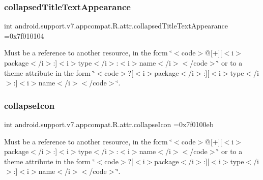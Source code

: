 \subsubsection{\texorpdfstring{collapsed\+Title\+Text\+Appearance}{collapsedTitleTextAppearance}}
{\footnotesize\ttfamily int android.\+support.\+v7.\+appcompat.\+R.\+attr.\+collapsed\+Title\+Text\+Appearance =0x7f010104\hspace{0.3cm}{\ttfamily [static]}}

Must be a reference to another resource, in the form \char`\"{}$<$code$>$@\mbox{[}+\mbox{]}\mbox{[}$<$i$>$package$<$/i$>$\+:\mbox{]}$<$i$>$type$<$/i$>$\+:$<$i$>$name$<$/i$>$$<$/code$>$\char`\"{} or to a theme attribute in the form \char`\"{}$<$code$>$?\mbox{[}$<$i$>$package$<$/i$>$\+:\mbox{]}\mbox{[}$<$i$>$type$<$/i$>$\+:\mbox{]}$<$i$>$name$<$/i$>$$<$/code$>$\char`\"{}. \mbox{\label{classandroid_1_1support_1_1v7_1_1appcompat_1_1R_1_1attr_a8a292560ceb637b93ed32829f1aa456d}} 
\subsubsection{\texorpdfstring{collapse\+Icon}{collapseIcon}}
{\footnotesize\ttfamily int android.\+support.\+v7.\+appcompat.\+R.\+attr.\+collapse\+Icon =0x7f0100eb\hspace{0.3cm}{\ttfamily [static]}}

Must be a reference to another resource, in the form \char`\"{}$<$code$>$@\mbox{[}+\mbox{]}\mbox{[}$<$i$>$package$<$/i$>$\+:\mbox{]}$<$i$>$type$<$/i$>$\+:$<$i$>$name$<$/i$>$$<$/code$>$\char`\"{} or to a theme attribute in the form \char`\"{}$<$code$>$?\mbox{[}$<$i$>$package$<$/i$>$\+:\mbox{]}\mbox{[}$<$i$>$type$<$/i$>$\+:\mbox{]}$<$i$>$name$<$/i$>$$<$/code$>$\char`\"{}. \mbox{\label{classandroid_1_1support_1_1v7_1_1appcompat_1_1R_1_1attr_a0711bae987f6ffaba425e74b5fc2af92}} 
